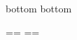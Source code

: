 {{\everyheadingmarks bottom
\everyfootingmarks bottom


\parseargdef{}

\def\headingsoff{%
  \evenheadline={\hfil}\evenfootline={\hfil}%
   \oddheadline={\hfil}\oddfootline={\hfil}%
}

\def\HEADINGSoff{{ \headingsoff}} %
\HEADINGSoff  %

\def\HEADINGSdouble{%
\global\pageno=1
\global\evenfootline={\hfil}
\global\oddfootline={\hfil}
\global\evenheadline={\line{\folio\hfil\thistitle}}
\global\oddheadline={\line{\thischapterheading\hfil\folio}}
\global\let\contentsalignmacro = \chapoddpage
}
\let\contentsalignmacro = \chappager

\def\HEADINGSsingle{%
\global\pageno=1
\global\evenfootline={\hfil}
\global\oddfootline={\hfil}
\global\evenheadline={\line{\thischapterheading\hfil\folio}}
\global\oddheadline={\line{\thischapterheading\hfil\folio}}
\global\let\contentsalignmacro = \chappager
}
\def\HEADINGSon{\HEADINGSdouble}

\def\HEADINGSafter{\let\HEADINGShook=\HEADINGSdoublex}
\let\HEADINGSdoubleafter=\HEADINGSafter
\def\HEADINGSdoublex{%
\global\evenfootline={\hfil}
\global\oddfootline={\hfil}
\global\evenheadline={\line{\folio\hfil\thistitle}}
\global\oddheadline={\line{\thischapterheading\hfil\folio}}
\global\let\contentsalignmacro = \chapoddpage
}

\def\HEADINGSsingleafter{\let\HEADINGShook=\HEADINGSsinglex}
\def\HEADINGSsinglex{%
\global\evenfootline={\hfil}
\global\oddfootline={\hfil}
\global\evenheadline={\line{\thischapterheading\hfil\folio}}
\global\oddheadline={\line{\thischapterheading\hfil\folio}}
\global\let\contentsalignmacro = \chappager
}

}}
